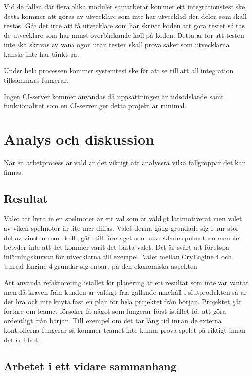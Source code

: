 \documentclass[a4paper,12pt,oneside,final]{extbook}
\begin{document}
Vid de fallen där flera olika moduler samarbetar kommer ett integrationstest ske, detta kommer att göras av utvecklare som inte har utvecklad den delen som skall testas. Går det inte att få utvecklare som har skrivit koden att göra testet så tas de utvecklare som har minst överblickande koll på koden. Detta är för att testen inte ska skrivas av vana ögon utan testen skall prova saker som utvecklarna kanske inte har tänkt på.

Under hela processen kommer systemtest ske för att se till att all integration tillsammans fungerar.

Ingen CI-server kommer användas då uppsättningen är tidsödslande samt funktionalitet som en CI-server ger detta projekt är minimal.


\chapter{Analys och diskussion}

När en arbetprocess är vald är det viktigt att analysera vilka fallgroppar det kan finnas.


\section{Resultat}
Valet att hyra in en spelmotor är ett val som är väldigt lättmotiverat men valet av viken spelmotor är lite mer diffus. Valet denna gång grundade sig i hur stor del av vinsten som skulle gått till företaget som utvecklade spelmotorn men det betyder inte att det kommer varit det bästa valet. Det är svårt att förutspå inlärningskurvan för utvecklarna till exempel. Valet mellan CryEngine 4 och Unreal Engine 4 grundar sig enbart på den ekonomiska aspekten.

Att använda refaktorering istället för planering är ett resultat som inte var väntat men då kraven från kunden är väldigt fria gällande innehåll i slutprodukten så är det bra och inte knyta fast en plan för hela projektet från början. Projektet går fortare om teamet försöker få något som fungerar först istället för att göra ordentligt från början. Till exempel om det tar lång tid innan de externa kontrollerna fungerar så kommer teamet inte kunna prova spelet på riktigt innan det är klart.

\section{Arbetet i ett vidare sammanhang}
\end{document}
